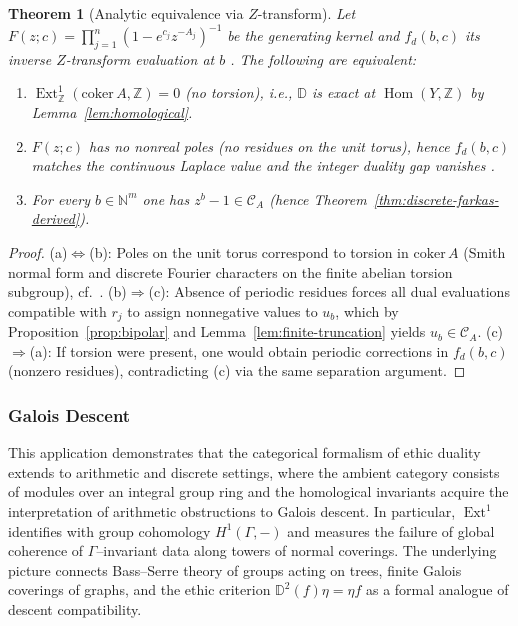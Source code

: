 \documentclass[12pt]{article}
\newcommand{\DD}{\mathbb{D}}
\newcommand{\Hom}{\operatorname{Hom}}
\newcommand{\Ext}{\operatorname{Ext}}
\theoremstyle{plain}
\newtheorem{theorem}{Theorem}[section]
\theoremstyle{definition}
\theoremstyle{remark}
\numberwithin{equation}{section}
\begin{document}
\begin{theorem}[Analytic equivalence via $Z$-transform]\label{thm:z-transform-equivalence}
Let $F(z;c)=\prod_{j=1}^n(1-e^{c_j}z^{-A_j})^{-1}$ be the generating kernel and $f_d(b,c)$ its inverse $Z$-transform evaluation at $b$ \cite{Lasserre2002}. The following are equivalent:
\begin{enumerate}[label=(\alph*)]
\item $\Ext^1_{\mathbb Z}(\mathrm{coker}\,A,\mathbb Z)=0$ (no torsion), i.e., $\DD$ is exact at $\Hom(Y,\mathbb Z)$ by Lemma~\ref{lem:homological}.
\item $F(z;c)$ has no nonreal poles (no residues on the unit torus), hence $f_d(b,c)$ matches the continuous Laplace value and the integer duality gap vanishes \cite{Lasserre2002}.
\item For every $b\in\mathbb N^m$ one has $z^b-1\in \mathcal C_A$ (hence Theorem~\ref{thm:discrete-farkas-derived}).
\end{enumerate}
\end{theorem}

\begin{proof}
(a)$\Leftrightarrow$(b): Poles on the unit torus correspond to torsion in $\mathrm{coker}\,A$ (Smith normal form and discrete Fourier characters on the finite abelian torsion subgroup), cf.\ \cite{Lasserre2002}.  
(b)$\Rightarrow$(c): Absence of periodic residues forces all dual evaluations compatible with $r_j$ to assign nonnegative values to $u_b$, which by Proposition~\ref{prop:bipolar} and Lemma~\ref{lem:finite-truncation} yields $u_b\in \mathcal C_A$.  
(c)$\Rightarrow$(a): If torsion were present, one would obtain periodic corrections in $f_d(b,c)$ (nonzero residues), contradicting (c) via the same separation argument.
\end{proof}

\subsubsection{Galois Descent}\label{sec:galois}

This application demonstrates that the categorical formalism of ethic duality extends to arithmetic and discrete settings, where the ambient category consists of modules over an integral group ring and the homological invariants acquire the interpretation of arithmetic obstructions to Galois descent. In particular, $\Ext^1$ identifies with group cohomology $H^1(\Gamma,-)$ and measures the failure of global coherence of $\Gamma$--invariant data along towers of normal coverings.  The underlying picture connects Bass--Serre theory of groups acting on trees, finite Galois coverings of graphs, and the ethic criterion $\mathbb D^2(f)\eta=\eta f$ as a formal analogue of descent compatibility.
\end{document}
